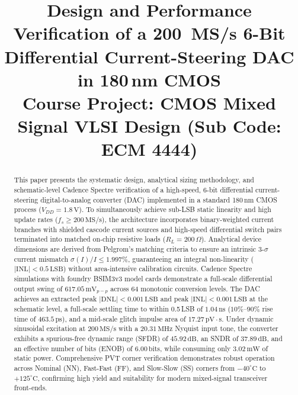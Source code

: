 \documentclass[conference,10pt]{IEEEtran}
\begin{document}
\title{Design and Performance Verification of a 200~MS/s 6-Bit Differential Current-Steering DAC in 180\,nm CMOS\\
\large\textmd{Course Project: CMOS Mixed Signal VLSI Design (Sub Code: ECM 4444)}}

\author{
}

\maketitle

\begin{abstract}
This paper presents the systematic design, analytical sizing methodology, and schematic-level Cadence Spectre verification of a high-speed, 6-bit differential current-steering digital-to-analog converter (DAC) implemented in a standard 180\,nm CMOS process ($V_{DD} = 1.8\,\text{V}$). To simultaneously achieve sub-LSB static linearity and high update rates ($f_s \ge 200\,\text{MS/s}$), the architecture incorporates binary-weighted current branches with shielded cascode current sources and high-speed differential switch pairs terminated into matched on-chip resistive loads ($R_L = 200\,\Omega$). Analytical device dimensions are derived from Pelgrom's matching criteria to ensure an intrinsic 3-$\sigma$ current mismatch $\sigma(I)/I \le 1.997\%$, guaranteeing an integral non-linearity ($|\text{INL}| < 0.5\,\text{LSB}$) without area-intensive calibration circuits. Cadence Spectre simulations with foundry BSIM3v3 model cards demonstrate a full-scale differential output swing of $617.05\,\text{mV}_{p-p}$ across 64 monotonic conversion levels. The DAC achieves an extracted peak $|\text{DNL}| < 0.001\,\text{LSB}$ and peak $|\text{INL}| < 0.001\,\text{LSB}$ at the schematic level, a full-scale settling time to within 0.5\,LSB of $1.04\,\text{ns}$ ($10\%$--$90\%$ rise time of $463.5\,\text{ps}$), and a mid-scale glitch impulse area of $17.27\,\text{pV}\cdot\text{s}$. Under dynamic sinusoidal excitation at $200\,\text{MS/s}$ with a $20.31\,\text{MHz}$ Nyquist input tone, the converter exhibits a spurious-free dynamic range (SFDR) of $45.92\,\text{dB}$, an SNDR of $37.89\,\text{dB}$, and an effective number of bits (ENOB) of $6.00\,\text{bits}$, while consuming only $3.02\,\text{mW}$ of static power. Comprehensive PVT corner verification demonstrates robust operation across Nominal (NN), Fast-Fast (FF), and Slow-Slow (SS) corners from $-40^\circ\text{C}$ to $+125^\circ\text{C}$, confirming high yield and suitability for modern mixed-signal transceiver front-ends.
\end{abstract}
\end{document}
